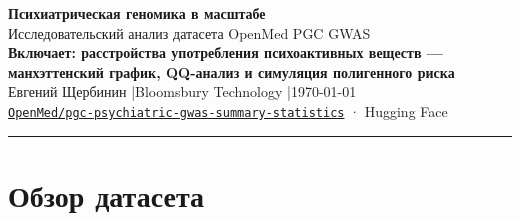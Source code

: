 \documentclass[11pt, a4paper]{article}
\begin{document}
\begin{center}
  {\LARGE\bfseries\color{accent} Психиатрическая геномика в масштабе}\\[4pt]
  {\large Исследовательский анализ датасета OpenMed PGC GWAS}\\[3pt]
  {\normalsize\color{sudcol}\bfseries
    Включает: расстройства употребления психоактивных веществ —
    манхэттенский график, QQ-анализ и симуляция полигенного риска}\\[10pt]
  {\normalsize Евгений Щербинин \quad|\quad Bloomsbury Technology \quad|\quad \today}\\[2pt]
  {\small\color{muted}
    \href{https://huggingface.co/collections/OpenMed/pgc-psychiatric-gwas-summary-statistics}%
    {\texttt{OpenMed/pgc-psychiatric-gwas-summary-statistics}} · Hugging Face}
\end{center}
\vspace{4pt}\hrule\vspace{14pt}

\begin{abstract}
\noindent
Организация OpenMed стандартизировала все мета-анализы полногеномных
ассоциативных исследований (GWAS), опубликованные Психиатрическим геномным
консорциумом (PGC), в единую коллекцию на Hugging Face:
\textbf{1,14 миллиарда строк}, \textbf{12 психиатрических нозологий},
\textbf{52 ключевых исследования}. В данном отчёте представлены:
профилирование схем данных, характеристики частот минорных аллелей,
кросс-нозологические корреляции генетических эффектов по 489~904 общим
SNP, а также расширенный анализ подисследования \textbf{SUD2023}
(расстройства употребления психоактивных веществ), включающий
манхэттенский график, QQ-диаграмму ($\lambda_\text{GC} = 1{,}492$,
13 геномно-значимых хитов в выборке), профиль кросс-нозологических
корреляций и симуляцию полигенного оценочного риска (PRS) в рамках
модели порога ответственности.
\end{abstract}
\vspace{8pt}

\section{Обзор датасета}
\end{document}
